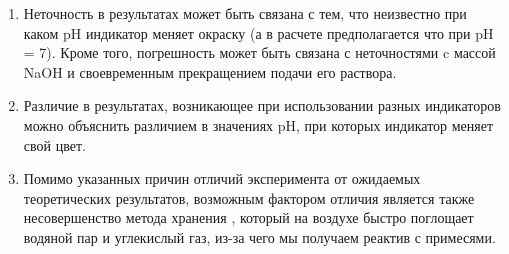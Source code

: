 \documentclass[a4paper, 12pt]{article}
\begin{document}
\begin{enumerate}
	\item Неточность в результатах может быть связана с тем, что неизвестно при каком pH индикатор меняет окраску (а в расчете предполагается что при pH = 7). Кроме того, погрешность может быть связана с неточностями c массой NaOH и своевременным прекращением подачи его раствора.
	
	\item Различие в результатах, возникающее при использовании разных индикаторов можно объяснить различием в значениях pH, при которых индикатор меняет свой цвет.
	
	\item Помимо указанных причин отличий эксперимента от ожидаемых теоретических результатов, возможным фактором отличия является также несовершенство метода хранения , который на воздухе быстро поглощает водяной пар и углекислый газ, из-за чего мы получаем реактив с примесями.
\end{enumerate}


	
\end{document}
